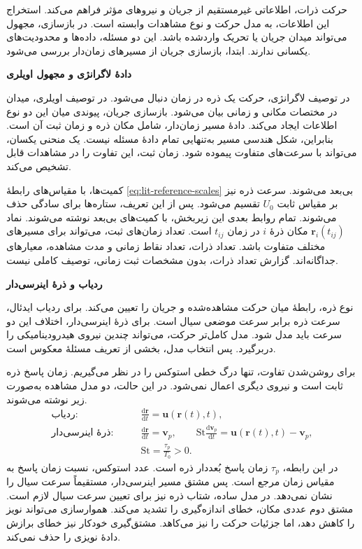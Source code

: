 \label{sec:lit-trajectory-inverse}

حرکت ذرات، اطلاعاتی غیرمستقیم از جریان و نیروهای مؤثر فراهم می‌کند.
استخراج این اطلاعات، به مدل حرکت و نوع مشاهدات وابسته است.
در بازسازی، مجهول می‌تواند میدان جریان یا تحریک واردشده باشد.
این دو مسئله، داده‌ها و محدودیت‌های یکسانی ندارند.
ابتدا، بازسازی جریان از مسیرهای زمان‌دار بررسی می‌شود.

\label{sec:lit-timed-flow-inverse}

\textbf{دادهٔ لاگرانژی و مجهول اویلری}

در توصیف لاگرانژی، حرکت یک ذره در زمان دنبال می‌شود.
در توصیف اویلری، میدان در مختصات مکانی و زمانی بیان می‌شود.
بازسازی جریان، پیوندی میان این دو نوع اطلاعات ایجاد می‌کند.
دادهٔ مسیر زمان‌دار، شامل مکان ذره و زمان ثبت آن است.
بنابراین، شکل هندسی مسیر به‌تنهایی تمام دادهٔ مسئله نیست.
یک منحنی یکسان، می‌تواند با سرعت‌های متفاوت پیموده شود.
زمان ثبت، این تفاوت را در مشاهدات قابل تشخیص می‌کند.

کمیت‌ها، با مقیاس‌های رابطهٔ \ref{eq:lit-reference-scales} بی‌بعد می‌شوند.
سرعت ذره نیز بر مقیاس ثابت $U_0$ تقسیم می‌شود.
پس از این تعریف، ستاره‌ها برای سادگی حذف می‌شوند.
تمام روابط بعدی این زیربخش، با کمیت‌های بی‌بعد نوشته می‌شوند.
نماد $\mathbf r_i(t_{ij})$ مکان ذرهٔ $i$ در زمان $t_{ij}$ است.
تعداد زمان‌های ثبت، می‌تواند برای مسیرهای مختلف متفاوت باشد.
تعداد ذرات، تعداد نقاط زمانی و مدت مشاهده، معیارهای جداگانه‌اند.
گزارش تعداد ذرات، بدون مشخصات ثبت زمانی، توصیف کاملی نیست.

\textbf{ردیاب و ذرهٔ اینرسی‌دار}

نوع ذره، رابطهٔ میان حرکت مشاهده‌شده و جریان را تعیین می‌کند.
برای ردیاب ایدئال، سرعت ذره برابر سرعت موضعی سیال است.
برای ذرهٔ اینرسی‌دار، اختلاف این دو سرعت باید مدل شود.
مدل کامل‌تر حرکت، می‌تواند چندین نیروی هیدرودینامیکی را دربرگیرد.
پس انتخاب مدل، بخشی از تعریف مسئلهٔ معکوس است.
\cite{MaxeyRiley1983}

برای روشن‌شدن تفاوت، تنها درگ خطی استوکس را در نظر می‌گیریم.
زمان پاسخ ذره ثابت است و نیروی دیگری اعمال نمی‌شود.
در این حالت، دو مدل مشاهده به‌صورت زیر نوشته می‌شوند.
\begin{equation}
\begin{aligned}
\text{ردیاب:}\qquad
&\frac{\mathrm d\mathbf r}{\mathrm dt}
=\mathbf u(\mathbf r(t),t),\\
\text{ذرهٔ اینرسی‌دار:}\qquad
&\frac{\mathrm d\mathbf r}{\mathrm dt}=\mathbf v_p,
\qquad
\mathrm{St}\frac{\mathrm d\mathbf v_p}{\mathrm dt}
=\mathbf u(\mathbf r(t),t)-\mathbf v_p,\\
&\mathrm{St}=\frac{\tau_p}{T_0}>0.
\end{aligned}
\label{eq:lit-timed-observation-models}
\end{equation}
در این رابطه، $\tau_p$ زمان پاسخ بُعددار ذره است.
عدد استوکس، نسبت زمان پاسخ به مقیاس زمان مرجع است.
پس مشتق مسیر اینرسی‌دار، مستقیماً سرعت سیال را نشان نمی‌دهد.
در مدل ساده، شتاب ذره نیز برای تعیین سرعت سیال لازم است.
مشتق دوم عددی مکان، خطای اندازه‌گیری را تشدید می‌کند.
هموارسازی می‌تواند نویز را کاهش دهد، اما جزئیات حرکت را نیز می‌کاهد.
مشتق‌گیری خودکار نیز خطای برازش دادهٔ نویزی را حذف نمی‌کند.
\cite{ZhouGrauer2026Joint}

